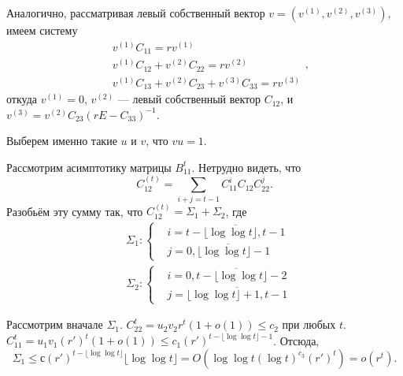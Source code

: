 \documentclass[11pt]{article}
\begin{document}
Аналогично, рассматривая левый собственный вектор $v = (v^{(1)}, v^{(2)}, v^{(3)})$, имеем систему
\begin{equation}
    \begin{split}
        &v^{(1)} C_{11} = r v^{(1)} \\
        &v^{(1)} C_{12} + v^{(2)} C_{22} = r v^{(2)} \\
        &v^{(1)} C_{13} + v^{(2)} C_{23} + v^{(3)} C_{33} = r v^{(3)}
    \end{split},
\end{equation}
откуда $v^{(1)} = 0$, $v^{(2)}$ --- левый собственный вектор $C_{12}$, и $v^{(3)} = v^{(2)} C_{23} (rE - C_{33})^{-1}$.

Выберем именно такие $u$ и $v$, что $vu = 1$.

Рассмотрим асимптотику матрицы $B_{11}^t$. Нетрудно видеть, что
\begin{equation}
    C_{12}^{(t)} = \sum_{i + j = t-1} C_{11}^i C_{12} C_{22}^j.
\end{equation}
Разобьём эту сумму так, что $C_{12}^{(t)} = \Sigma_1 + \Sigma_2$, где
\begin{equation}
    \begin{split}
        &\Sigma_1 : \left\{
        \begin{split}
            &i = \overline{ t - \lfloor \log \log t \rfloor, t-1 } \\
            &j = \overline{ 0, \lfloor \log \log t \rfloor - 1 }
        \end{split} \right. \\
        &\Sigma_2 : \left\{ 
        \begin{split}
            &i = \overline{ 0, t - \lfloor \log \log t \rfloor - 2 } \\
            &j = \overline{ \lfloor \log \log t \rfloor + 1, t-1 }
        \end{split} \right.
    \end{split}
\end{equation}

Рассмотрим вначале $\Sigma_1$. $C_{22}^t = u_2 v_2 r^t (1 + o(1)) \leqslant c_2$ при любых $t$. $C_{11}^t = u_1 v_1 (r')^t (1 + o(1)) \leqslant c_1 (r')^{t - \lfloor \log \log t \rfloor - 1}$. Отсюда,
\begin{equation}
    \Sigma_1 \leqslant с (r')^{t - \lfloor \log \log t \rfloor} \lfloor \log \log t \rfloor = O(\log \log t (\log t)^{c_3} (r')^t) = o(r^t).
\end{equation}
\end{document}
